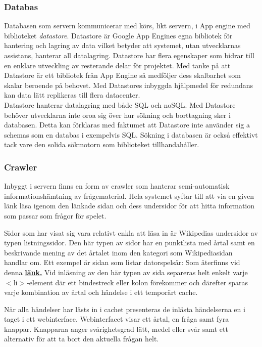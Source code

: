 \documentclass[a4paper, 11pt]{article}
\begin{document}
\subsubsection{Databas}
Databasen som servern kommunicerar med körs, likt servern, i App engine med biblioteket \textit{datastore}. Datastore \cite{datastore} är Google App Engines egna bibliotek för hantering och lagring av data vilket betyder att systemet, utan utvecklarnas assistans, hanterar all datalagring. Datastore har flera egenskaper som bidrar till en enklare utveckling av resterande delar för projektet. Med tanke på att Datastore är ett bibliotek från App Engine så medföljer dess skalbarhet som skalar beroende på behovet. Med Datastores inbyggda hjälpmedel för redundans kan data lätt replikeras till flera datacenter. \\
Datastore hanterar datalagring med både SQL och noSQL. Med Datastore behöver utvecklarna inte oroa sig över hur sökning och borttagning sker i databasen. Detta kan förklaras med faktumet att Datastore inte använder sig a schemas som en databas i exempelvis SQL. Sökning i databasen är också effektivt tack vare den solida sökmotorn som biblioteket tillhandahåller.

\subsubsection{Crawler} \label{crawler}
Inbyggt i servern finns en form av crawler som hanterar semi-automatisk informationshämtning av frågematerial. Hela systemet syftar till att via en given länk läsa igenom den länkade sidan och dess undersidor för att hitta information som passar som frågor för spelet. 

Sidor som har visat sig vara relativt enkla att läsa in är Wikipedias undersidor av typen listningssidor. Den här typen av sidor har en punktlista med årtal samt en beskrivande mening av det årtalet inom den kategori som Wikipediasidan handlar om. Ett exempel är sidan som listar datorspelsår: Som återfinns vid denna  \textbf{\href{http://sv.wikipedia.org/wiki/Lista_\%C3\%B6ver_datorspels\%C3\%A5r}{länk.}} 
Vid inläsning av den här typen av sida separeras helt enkelt varje $<$li$>$-element där ett bindestreck eller kolon förekommer och därefter sparas varje kombination av årtal och händelse i ett temporärt cache.

När alla  händelser har lästs in i cachet presenteras de inlästa händelserna en i taget i ett webinterface. Webinterfacet visar ett årtal, en fråga samt fyra knappar. Knapparna anger svårighetsgrad lätt, medel eller svår samt ett alternativ för att ta bort den aktuella frågan helt.
\end{document}
